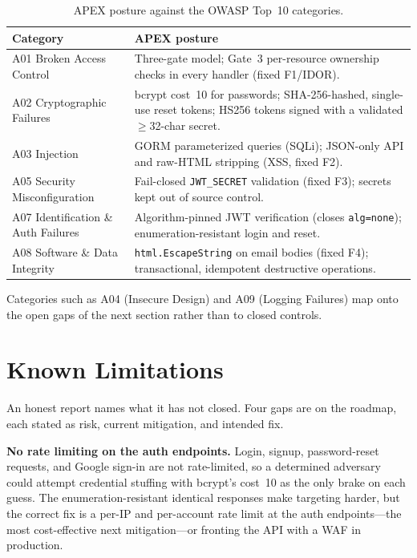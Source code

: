 \begin{table}[htbp]
\centering
\caption{APEX posture against the OWASP Top~10 categories.}
\label{tab:owasp}
\begin{tabularx}{\linewidth}{@{}l X@{}}
\toprule
\textbf{Category} & \textbf{APEX posture} \\
\midrule
A01 Broken Access Control & Three-gate model; Gate~3 per-resource ownership
checks in every handler (fixed F1/IDOR). \\
\addlinespace
A02 Cryptographic Failures & bcrypt cost~10 for passwords; SHA-256-hashed,
single-use reset tokens; HS256 tokens signed with a validated $\geq$32-char
secret. \\
\addlinespace
A03 Injection & GORM parameterized queries (SQLi); JSON-only API and raw-HTML
stripping (XSS, fixed F2). \\
\addlinespace
A05 Security Misconfiguration & Fail-closed \texttt{JWT\_SECRET} validation
(fixed F3); secrets kept out of source control. \\
\addlinespace
A07 Identification \& Auth Failures & Algorithm-pinned JWT verification (closes
\texttt{alg=none}); enumeration-resistant login and reset. \\
\addlinespace
A08 Software \& Data Integrity & \texttt{html.EscapeString} on email bodies
(fixed F4); transactional, idempotent destructive operations. \\
\bottomrule
\end{tabularx}
\end{table}

Categories such as A04 (Insecure Design) and A09 (Logging Failures) map onto the
open gaps of the next section rather than to closed controls.

\section{Known Limitations}
\label{sec:gaps}

An honest report names what it has not closed. Four gaps are on the roadmap, each
stated as risk, current mitigation, and intended fix.

\textbf{No rate limiting on the auth endpoints.} Login, signup,
password-reset requests, and Google sign-in are not rate-limited, so a
determined adversary could attempt credential stuffing with bcrypt's cost~10 as
the only brake on each guess. The enumeration-resistant identical responses make
targeting harder, but the correct fix is a per-IP and per-account rate limit at
the auth endpoints---the most cost-effective next mitigation---or fronting the
API with a WAF in production.

